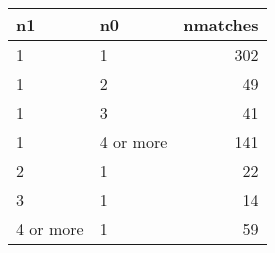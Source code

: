 \begin{table}[ht]
\centering
\begingroup\footnotesize
\begin{tabular}{llr}
  \hline
n1 & n0 & nmatches \\ 
  \hline
1 & 1 & 302 \\ 
  1 & 2 &  49 \\ 
  1 & 3 &  41 \\ 
  1 & 4 or more & 141 \\ 
  2 & 1 &  22 \\ 
  3 & 1 &  14 \\ 
  4 or more & 1 &  59 \\ 
   \hline
\end{tabular}
\endgroup
\caption{} 
\end{table}
